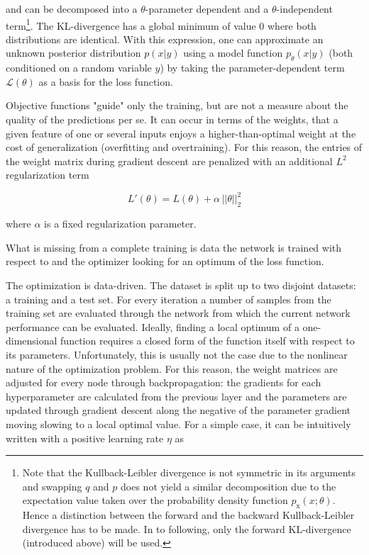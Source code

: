 and can be decomposed into a $\theta$-parameter dependent and a $\theta$-independent term\footnote{Note that the Kullback-Leibler divergence is not symmetric in its arguments and swapping $q$ and $p$ does not yield a similar decomposition due to the expectation value taken over the probability density function $p_\text{x}(x; \theta)$. Hence a distinction between the forward and the backward Kullback-Leibler divergence has to be made. In to following, only the forward KL-divergence (introduced above) will be used.}. The KL-divergence has a global minimum of value 0 where both distributions are identical. With this expression, one can approximate an unknown posterior distribution $p(x | y)$ using a model function $p_\theta(x | y)$ (both conditioned on a random variable $y$) by taking the parameter-dependent term $\mathcal{L}(\theta)$ as a basis for the loss function.

Objective functions "guide" only the training, but are not a measure about the quality of the predictions per se. It can occur in terms of the weights, that a given feature of one or several inputs enjoys a higher-than-optimal weight at the cost of generalization (overfitting and overtraining). For this reason, the entries of the weight matrix during gradient descent are penalized with an additional $L^2$ regularization term

\begin{equation}
	L'(\theta) = L(\theta) + \alpha \, ||\theta|| _2^2
\end{equation}

where $\alpha$ is a fixed regularization parameter.

What is missing from a complete training is data the network is trained with respect to and the optimizer looking for an optimum of the loss function.



The optimization is data-driven. The dataset is split up to two disjoint datasets: a training and a test set. For every iteration a number of samples from the training set are evaluated through the network from which the current network performance can be evaluated. Ideally, finding a local optimum of a one-dimensional function requires a closed form of the function itself with respect to its parameters. Unfortunately, this is usually not the case due to the nonlinear nature of the optimization problem. For this reason, the weight matrices are adjusted for every node through backpropagation: the gradients for each hyperparameter are calculated from the previous layer and the parameters are updated through gradient descent along the negative of the parameter gradient moving slowing to a local optimal value. For a simple case, it can be intuitively written with a positive learning rate $\eta$ as


